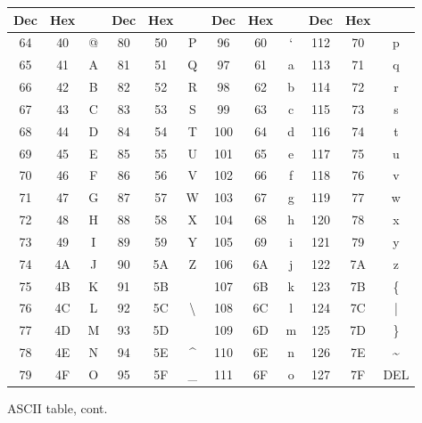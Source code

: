 \documentclass[../index.tex]{subfiles}
\begin{document}
\begin{frame}{\currenttitle}
%
  \vspace*{1em}
  \scriptsize
  \begin{figure}
    \begin{table}
      \begin{tabular}{|c|c|c||c|c|c||c|c|c||c|c|c|}                                                 \hline
        Dec & Hex &  & Dec & Hex &                & Dec & Hex  &  & Dec & Hex  &                 \\ \hline
        64 & 40 & @  & 80 & 50 & P                & 96 & 60  & `  & 112 & 70 & p                 \\
        65 & 41 & A  & 81 & 51 & Q                & 97 & 61  & a  & 113 & 71 & q                 \\
        66 & 42 & B  & 82 & 52 & R                & 98 & 62  & b  & 114 & 72 & r                 \\
        67 & 43 & C  & 83 & 53 & S                & 99 & 63  & c  & 115 & 73 & s                 \\
        68 & 44 & D  & 84 & 54 & T                & 100 & 64 & d  & 116 & 74 & t                 \\
        69 & 45 & E  & 85 & 55 & U                & 101 & 65 & e  & 117 & 75 & u                 \\
        70 & 46 & F  & 86 & 56 & V                & 102 & 66 & f  & 118 & 76 & v                 \\
        71 & 47 & G  & 87 & 57 & W                & 103 & 67 & g  & 119 & 77 & w                 \\
        72 & 48 & H  & 88 & 58 & X                & 104 & 68 & h  & 120 & 78 & x                 \\
        73 & 49 & I  & 89 & 59 & Y                & 105 & 69 & i  & 121 & 79 & y                 \\
        74 & 4A & J  & 90 & 5A & Z                & 106 & 6A & j  & 122 & 7A & z                 \\
        75 & 4B & K  & 91 & 5B & \lbrack{}        & 107 & 6B & k  & 123 & 7B & \{                \\
        76 & 4C & L  & 92 & 5C & \textbackslash{} & 108 & 6C & l  & 124 & 7C & |                 \\
        77 & 4D & M  & 93 & 5D & \rbrack{}        & 109 & 6D & m  & 125 & 7D & \}                \\
        78 & 4E & N  & 94 & 5E & \^{}             & 110 & 6E & n  & 126 & 7E & \textasciitilde{} \\
        79 & 4F & O  & 95 & 5F & \_               & 111 & 6F & o  & 127 & 7F & DEL               \\ \hline
      \end{tabular}
    \end{table}
    \caption{ASCII table, cont.}
  \end{figure}
  \normal
\end{frame}
\end{document}
